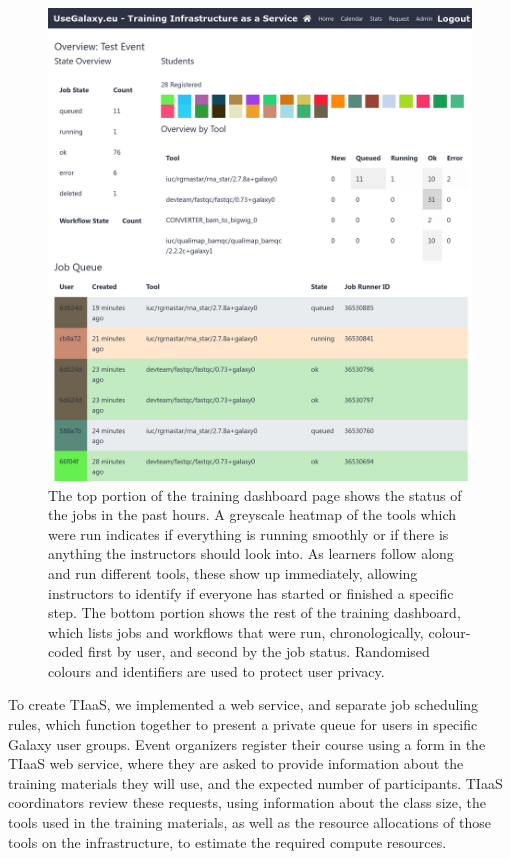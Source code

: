 \documentclass[a4paper,num-refs]{oup-contemporary}
\begin{document}
\begin{figure}[bt!]
\centering
\includegraphics[width=\linewidth]{images/dashboard.png}
\caption{The top portion of the training dashboard page shows the status of the jobs in the past hours. A greyscale heatmap of the tools which were run indicates if everything is running smoothly or if there is anything the instructors should look into. As learners follow along and run different tools, these show up immediately, allowing instructors to identify if everyone has started or finished a specific step. The bottom portion shows the rest of the training dashboard, which lists jobs and workflows that were run, chronologically, colour-coded first by user, and second by the job status. Randomised colours and identifiers are used to protect user privacy.}\label{figure:dashboard}
\end{figure}

To create TIaaS, we implemented a web service, and separate job scheduling rules, which function together to present a private queue for users in specific Galaxy user groups. Event organizers register their course using a form in the TIaaS web service, where they are asked to provide information about the training  materials they will use, and the expected number of participants. TIaaS coordinators  review these requests, using information about the class size, the tools used in the training materials, as well as the resource allocations of those tools on the infrastructure, to estimate the required compute resources.
\end{document}

